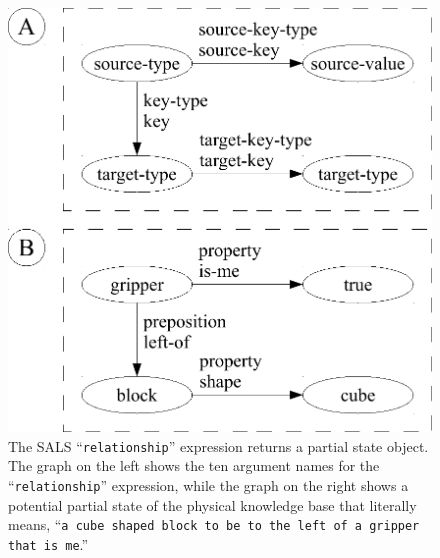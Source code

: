 \begin{figure}
\centering
\includegraphics[width=12cm]{gfx/relationship_partial_state_graph-handdrawn}
\caption[The SALS ``{\tt{relationship}}'' expression returns a partial
  state object.]{The SALS ``{\tt{relationship}}'' expression returns a
  partial state object.  The graph on the left shows the ten argument
  names for the ``{\tt{relationship}}'' expression, while the graph on
  the right shows a potential partial state of the physical knowledge
  base that literally means, ``{\tt{a cube shaped block to be to the
      left of a gripper that is me}}.''}
\label{figure:relationship_partial_state_graph}
\end{figure}

